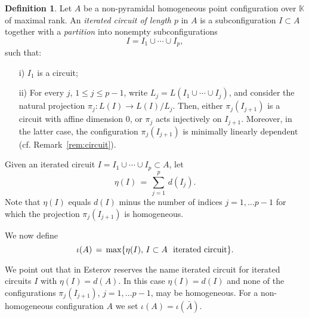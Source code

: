 \documentclass[11pt]{amsart}
\theoremstyle{plain}
\theoremstyle{definition}
\newtheorem{definition}[theorem]{Definition}
\theoremstyle{remark}
\renewcommand{\k}{{\mathbb K}}
\numberwithin{equation}{section}
\begin{document}
\begin{definition}\label{def:itercircuit}
Let $A$ be a non-pyramidal homogeneous point configuration over $\k$ of maximal rank.
An {\em iterated circuit of length $p$} in $A$ is a subconfiguration $I \subset A$
together with a {\em partition} into nonempty subconfigurations
$$ I =  I_1 \cup \cdots \cup I_p,$$
such that:
\begin{enumerate}
\item[i)] $I_1$ is a circuit;
\item[ii)] For every $j$, $1\leq j\leq p-1$, write 
$L_{j}= L(I_1 \cup \cdots \cup I_{j})$,   and consider the natural projection
$\pi_{j} \colon L(I) \to L(I)/ L_j$. 
Then, either $\pi_{j}(I_{j+1})$  is a circuit with affine dimension $0$, or $\pi_{j}$ acts injectively on $I_{j+1}$.
Moreover, in the latter case,  the configuration $\pi_{j}(I_{j+1})$ is minimally linearly dependent (cf. Remark~\ref{rem:circuit}).
\end{enumerate}
\end{definition}
 
Given an iterated circuit $I =I_1 \cup \cdots \cup I_p \subset A$, let
\begin{equation}\label{eq:eta}
\eta(I) \, = \,  \sum_{j=1}^p \,d(I_j).
\end{equation}
Note that $\eta(I)$ equals $d(I)$  minus the number of indices
$j=1, \dots p-1$ for which the projection $\pi_{j}(I_{j+1})$ is homogeneous.

We now define
\begin{equation}\label{eq:iota}
\iota(A) \, = \,  {\rm max} \{\eta(I), \, I \subset A \hbox{ \ iterated circuit} \}.
\end{equation}

 We point out that in \cite{E2} Esterov reserves the name iterated circuit for iterated circuits $I$ with $\eta(I)=d(A)$. 
 In this case $\eta(I) = d(I)$ and none of the configurations   $\pi_{j}(I_{j+1})$, 
  $j=1, \dots p-1$, may be homogeneous.  For a non-homogeneous configuration $A$ we set   $\iota(A) = \iota(\bar{A})$.
  
\end{document}
